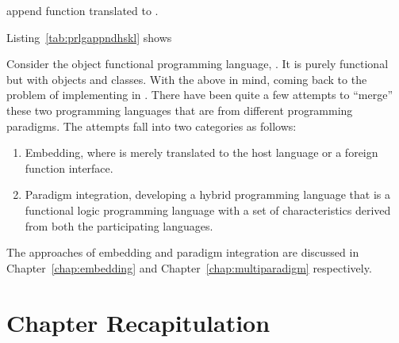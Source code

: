 \documentclass[thesis-solanki.tex]{subfiles}
\begin{document}
\begin{code-list}[th]
  \begin{singlespace}
    \inputminted[linenos]{haskell}{append.pl}
  \end{singlespace}
  \caption{ append function translated to .}
\label{tab:prlgappndhskl}
\end{code-list}

Listing~\ref{tab:prlgappndhskl} shows 

Consider the object functional programming language, 
\cite{website:scala}.
It is purely functional but with objects and classes.
With the above in mind, coming back to the problem of implementing  in .
There have been quite a few attempts to ``merge'' these two programming languages that are from different programming
paradigms.
The attempts fall into two categories as follows:

\begin{enumerate}
\item
  Embedding, where  is merely translated to the host language  or a foreign
  function interface.

\item
  Paradigm integration, developing a hybrid programming language that is a functional logic programming language
  with a set of characteristics derived from both the participating languages.
\end{enumerate}

The approaches of embedding and paradigm integration are discussed in Chapter~\ref{chap:embedding} and Chapter~\ref{chap:multiparadigm} 
respectively.  

\section{Chapter Recapitulation}

\ifMain
\begin{scope}
  \nolinenumbers
  \enotesize
  \par
  \begin{singlespace}
  \setlength{\parskip}{12pt plus 2pt minus 1pt}
  \theendnotes
  \par
  \end{singlespace}
\end{scope}
\fi
\end{document}

